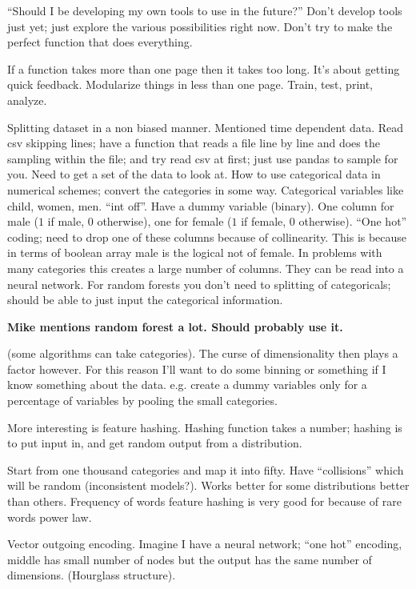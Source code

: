 ``Should I be developing my own tools to use in the future?''
Don't develop tools just yet; just explore the various possibilities
right now. Don't try to make the perfect function that does everything.

If a function takes more than one page then it takes too long.
It's about getting quick feedback. Modularize things in less than one page.
Train, test, print, analyze.

Splitting dataset in a non biased manner. Mentioned time dependent data.
Read csv skipping lines; have a function
that reads a file line by line and does the sampling within the file; and
try read csv at first; just use pandas to sample for you. 
Need to get a set of the data to look at.
How to use categorical data in numerical schemes; convert
the categories in some way. Categorical variables like child, women, men.
``int off''. Have a dummy variable (binary).
One column for male ($1$ if male, $0$ otherwise), one for female
($1$ if female, $0$ otherwise). ``One hot'' coding;
need to drop one of these columns because of collinearity.
This is because in terms of boolean array male is the logical not
of female. In problems with many categories this creates a large
number of columns. They can be read into a neural network.
For random forests you don't need to splitting of categoricals; should
be able to just input the categorical information.

\textbf{Mike mentions random forest a lot. Should probably use it.}

(some algorithms can take categories). The curse of dimensionality
then plays a factor however. For this reason I'll want
to do some binning or something if I know something about the data.
e.g. create a dummy variables only for a percentage of variables
by pooling the small categories.

More interesting is feature hashing. Hashing function takes
a number; hashing is to put input in, and get random output
from a distribution.

Start from one thousand categories and map it into fifty.
Have ``collisions'' which will be random (inconsistent models?).
Works better for some distributions better than others.
Frequency of words feature hashing is very good for because
of rare words power law.

Vector outgoing encoding. Imagine I have a neural network;
``one hot'' encoding, middle has small number of nodes but
the output has the same number of dimensions. (Hourglass structure).

